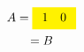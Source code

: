 \documentclass{article}
\begin{document}
\begin{multline*}
A=\colorbox{yellow}{$\begin{array}{cc}1 &0\end{array}$}\\
=B
\end{multline*}
\end{document}
